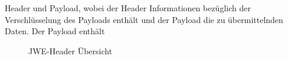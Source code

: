 Header und Payload, wobei der Header
Informationen bezüglich der Verschlüsselung des Payloads enthält und der Payload
die zu übermittelnden Daten. Der Payload enthält

\begin{figure}[h]
    \scalebox{.8}{
        
    }
    \caption{JWE-Header Übersicht}\label{ls: JWEHeader}
\end{figure}
